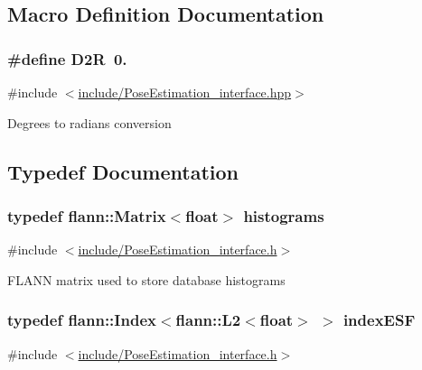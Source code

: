 \subsection{Macro Definition Documentation}
\hypertarget{group__Definitions_ga0a3cc1d5cde549e408f825ddd7f5853d}{
\subsubsection[{D2\-R}]{\setlength{\rightskip}{0pt plus 5cm}\#define D2\-R~0.}}\label{group__Definitions_ga0a3cc1d5cde549e408f825ddd7f5853d}


{\ttfamily \#include $<$\hyperlink{PoseEstimation__interface_8hpp}{include/\-Pose\-Estimation\-\_\-interface.\-hpp}$>$}

Degrees to radians conversion 

\subsection{Typedef Documentation}
\hypertarget{group__Definitions_ga136493056b2eaf642f660e6a45a62991}{
\subsubsection[{histograms}]{\setlength{\rightskip}{0pt plus 5cm}typedef flann\-::\-Matrix$<$float$>$ {\bf histograms}}}\label{group__Definitions_ga136493056b2eaf642f660e6a45a62991}


{\ttfamily \#include $<$\hyperlink{PoseEstimation__interface_8h}{include/\-Pose\-Estimation\-\_\-interface.\-h}$>$}

F\-L\-A\-N\-N matrix used to store database histograms \hypertarget{group__Definitions_ga3f45d3216269cf676ea864ae3bfcc446}{
\subsubsection[{index\-E\-S\-F}]{\setlength{\rightskip}{0pt plus 5cm}typedef flann\-::\-Index$<$flann\-::\-L2$<$float$>$ $>$ {\bf index\-E\-S\-F}}}\label{group__Definitions_ga3f45d3216269cf676ea864ae3bfcc446}


{\ttfamily \#include $<$\hyperlink{PoseEstimation__interface_8h}{include/\-Pose\-Estimation\-\_\-interface.\-h}$>$}

